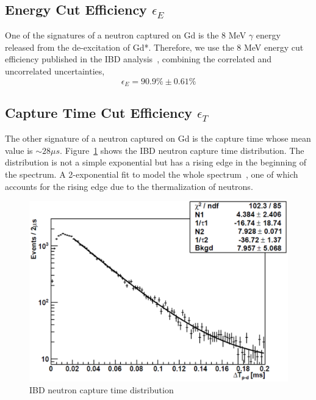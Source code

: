\subsection{Energy Cut Efficiency \texorpdfstring{$\epsilon_{E}$}{epsilon E}}

One of the signatures of a neutron captured on Gd is the 8 MeV $\gamma$ energy released from the de-excitation of Gd*. Therefore, we use the 8 MeV energy cut efficiency published in the IBD analysis~\cite{dayabay2012_1}, combining the correlated and uncorrelated uncertainties,
\begin{equation}
	\epsilon_{E}=90.9\%\pm 0.61\%
\end{equation}


\subsection{Capture Time Cut Efficiency \texorpdfstring{$\epsilon_{T}$}{epsilon T}}

The other signature of a neutron captured on Gd is the capture time whose mean value is $\sim 28\mu s$. Figure~\ref{fig:IBD_capture_time} shows the IBD neutron capture time distribution. The distribution is not a simple exponential but has a rising edge in the beginning of the spectrum. A 2-exponential fit to model the whole spectrum~\cite{docdb7299}, one of which accounts for the rising edge due to the thermalization of neutrons.
\begin{figure}
	\centering
	\includegraphics[width=.6\textwidth]{figures/chap7/IBD_capture_time.eps}
	\caption[IBD neutron capture time distribution]{IBD neutron capture time distribution~\cite{docdb7299}}
	\label{fig:IBD_capture_time}
\end{figure}

